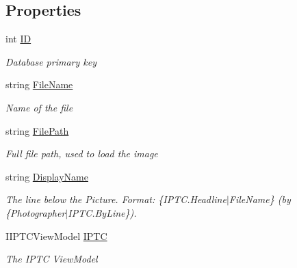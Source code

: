 \subsection*{Properties}
\begin{DoxyCompactItemize}
\item 
int \mbox{\hyperlink{class_pic_d_b_1_1_view_models_1_1_picture_view_model_a97814891952ce16bf7a1528fcd2216cd}{ID}}
\begin{DoxyCompactList}\small\item\em Database primary key \end{DoxyCompactList}\item 
string \mbox{\hyperlink{class_pic_d_b_1_1_view_models_1_1_picture_view_model_ab678cd98ea07f4e746fa45d10637fcdc}{File\+Name}}
\begin{DoxyCompactList}\small\item\em Name of the file \end{DoxyCompactList}\item 
string \mbox{\hyperlink{class_pic_d_b_1_1_view_models_1_1_picture_view_model_a6ddfcaf244162f0d6027f57ef6f753ae}{File\+Path}}
\begin{DoxyCompactList}\small\item\em Full file path, used to load the image \end{DoxyCompactList}\item 
string \mbox{\hyperlink{class_pic_d_b_1_1_view_models_1_1_picture_view_model_a5f013b83aa58f2d4d4cfd35a53e00eb4}{Display\+Name}}
\begin{DoxyCompactList}\small\item\em The line below the Picture. Format\+: \{I\+P\+T\+C.\+Headline$\vert$\+File\+Name\} (by \{Photographer$\vert$\+I\+P\+TC.By\+Line\}). \end{DoxyCompactList}\item 
I\+I\+P\+T\+C\+View\+Model \mbox{\hyperlink{class_pic_d_b_1_1_view_models_1_1_picture_view_model_a20d5866d8c026d9224b361249b92d657}{I\+P\+TC}}
\begin{DoxyCompactList}\small\item\em The I\+P\+TC View\+Model \end{DoxyCompactList}\item 

\end{DoxyCompactItemize}
